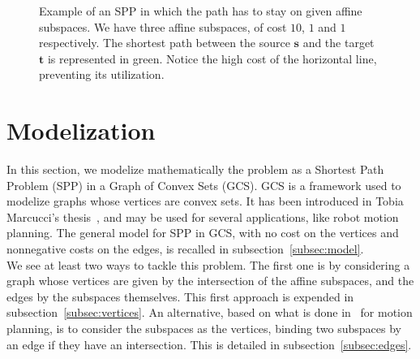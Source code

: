 \documentclass[a4paper, 12pt]{article}
\newlength{\indentsize}
\begin{document}
\begin{figure}[!htb]
    \centering
    \caption{Example of an SPP in which the path has to stay on given affine subspaces. We have three affine subspaces, of cost $10$, $1$ and $1$ respectively. The shortest path between the source $\mathbf{s}$ and the target $\mathbf{t}$ is represented in green. Notice the high cost of the horizontal line, preventing its utilization.}\label{fig:SPP-problem}
\end{figure}

\section{Modelization}\label{sec:modelization}
\hspace{\indentsize} In this section, we modelize mathematically the problem as a Shortest Path Problem (SPP) in a Graph of Convex Sets (GCS). GCS is a framework used to modelize graphs whose vertices are convex sets. It has been introduced in Tobia Marcucci's thesis~\cite{Tobia}, and may be used for several applications, like robot motion planning. The general model for SPP in GCS, with no cost on the vertices and nonnegative costs on the edges, is recalled in subsection~\ref{subsec:model}.\\
We see at least two ways to tackle this problem. The first one is by considering a graph whose vertices are given by the intersection of the affine subspaces, and the edges by the subspaces themselves. This first approach is expended in subsection~\ref{subsec:vertices}. An alternative, based on what is done in~\cite[Chapter~11]{Tobia} for motion planning, is to consider the subspaces as the vertices, binding two subspaces by an edge if they have an intersection. This is detailed in subsection~\ref{subsec:edges}.
\end{document}

